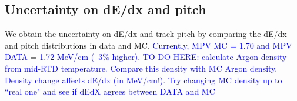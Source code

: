 


\subsection{Uncertainty on dE/dx and pitch}
We obtain the uncertainty on dE/dx and track pitch by comparing the dE/dx and pitch distributions in data and MC.
\textcolor{blue}{ Currently, MPV MC = 1.70 and MPV DATA = 1.72 MeV/cm (~3\% higher).
TO DO HERE: calculate Argon density from mid-RTD temperature. Compare this  density with MC Argon density. 
Density change  affects dE/dx (in MeV/cm!). Try changing MC density up to ``real one" and see if dEdX agrees between DATA and MC}


